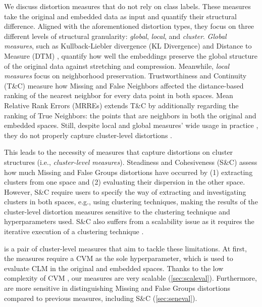 We discuss distortion measures that do not rely on class labels. 
These measures take the original and embedded data as input and quantify their structural difference.
Aligned with the aforementioned distortion types, they focus on three different levels of structural granularity: \textit{global}, \textit{local}, and \textit{cluster}.
\textit{Global measures}, such as Kullback-Liebler divergence (KL Divergence) and Distance to Measure (DTM) \cite{chazal11fcm, chazal17jmlr}, quantify how well the embeddings preserve the global structure of the original data against stretching and compression.
Meanwhile, \textit{local measures} focus on neighborhood preservation.
Trustworthiness and Continuity (T\&C) \cite{venna06nn} measure how Missing and False Neighbors affected the distance-based ranking of the nearest neighbor for every data point in both spaces. Mean Relative Rank Errors (MRREs) \cite{lee07springer} extends T\&C by additionally regarding the ranking of True Neighbors: the points that are neighbors in both the original and embedded spaces. 
Still, despite local and global measures' wide usage in practice \cite{jeon21tvcg, jeon22vis, lai22vis, xia22tvcg, nonato19tvcg, moor20icml}, they do not properly capture cluster-level distortions \cite{jeon21tvcg}. 

This leads to the necessity of measures that capture distortions on cluster structures (i.e., \textit{cluster-level measures}).
Steadiness and Cohesiveness (S\&C) \cite{jeon21tvcg}  assess how much Missing and False Groups  distortions have occurred by  (1) extracting clusters from one space and (2) evaluating their dispersion in the other space.
However, S\&C require users to specify the way of extracting and investigating clusters in both spaces, e.g., using clustering techniques, making the results of the cluster-level distortion measures sensitive to the clustering technique and hyperparameters used. 
S\&C also suffers from a scalability issue as it requires the iterative execution of a clustering technique \cite{jeon21tvcg, fujiwara22arxiv}.


\ltc is a pair of cluster-level measures that aim to tackle these limitations. At first, the measures require a CVM as the sole hyperparameter, which is used to evaluate CLM in the original and embedded spaces. 
Thanks to the low complexity of CVM \cite{liu10icdm, jeon22arxiv2}, our measures are very scalable (\autoref{sec:scaleval}). Furthermore, \lsc are more sensitive in distinguishing Missing and False Groups distortions compared to previous measures, including S\&C (\autoref{sec:seneval}).




